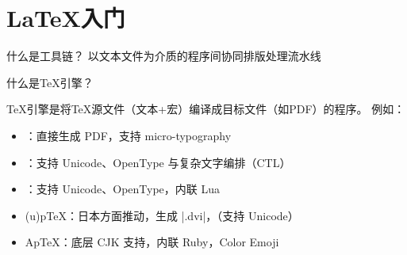 
\section{\LaTeX{}入门}

\begin{frame}{\secname}
  \centering
\end{frame}

\begin{frame}{什么是工具链？}
  以文本文件为介质的程序间协同排版处理流水线
  \pause
  \centering
  
\end{frame}

\begin{frame}{什么是\TeX{}引擎？}

  \TeX{}引擎是将\TeX{}源文件（文本+宏）编译成目标文件（如PDF）的程序。
  \pause{}例如：
  \begin{itemize}
    \item \pdfTeX{}：直接生成 PDF，支持 micro-typography
    \item \XeTeX{}：支持 Unicode、OpenType 与复杂文字编排（CTL）
    \item \LuaTeX{}：支持 Unicode、OpenType，内联 Lua
    \item (u)p\TeX{}：日本方面推动，生成 |.dvi|，（支持 Unicode）
    \item Ap\TeX{}：底层 CJK 支持，内联 Ruby，Color Emoji 
  \end{itemize}
\end{frame}


